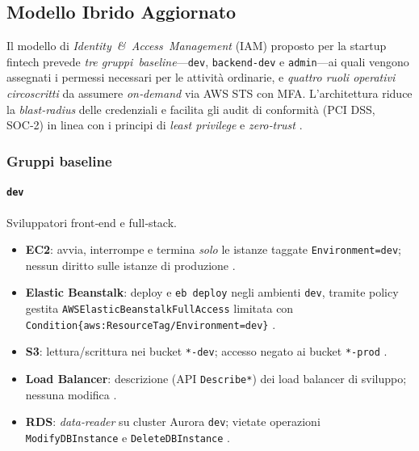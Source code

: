 \subsection{Modello Ibrido Aggiornato}
\label{subsec:modello_ibrido_aggiornato}

Il modello di \emph{Identity \& Access Management} (IAM) proposto per la startup fintech prevede \emph{tre gruppi baseline}—\texttt{dev}, \texttt{backend‑dev} e \texttt{admin}—ai quali vengono assegnati i permessi necessari per le attività ordinarie, e \emph{quattro ruoli operativi circoscritti} da assumere \emph{on‑demand} via AWS STS con MFA.
L'architettura riduce la \emph{blast‑radius} delle credenziali e facilita gli audit di conformità (PCI DSS, SOC‑2) in linea con i principi di \emph{least privilege} e \emph{zero‑trust} \cite{NIST_ZTA,NIST_SP80063,PCI_DSS,DatadogLeastPrivilege}.

\subsubsection{Gruppi baseline}
\label{subsubsec:gruppi_base}

\paragraph{\texttt{dev}}%
Sviluppatori front‑end e full‑stack.  
\begin{itemize}
  \item \textbf{EC2}: avvia, interrompe e termina \emph{solo} le istanze taggate \texttt{Environment=dev};
        nessun diritto sulle istanze di produzione \cite{AWSEC2IAM}.  
  \item \textbf{Elastic Beanstalk}: deploy e \verb|eb deploy| negli ambienti \texttt{dev},
        tramite policy gestita \texttt{AWSElasticBeanstalkFullAccess} limitata con
        \texttt{Condition\{aws:ResourceTag/Environment=dev\}} \cite{AWSEBRole}.  
  \item \textbf{S3}: lettura/scrittura nei bucket \texttt{*-dev}; accesso negato ai bucket \texttt{*-prod} \cite{AWSS3Security}.  
  \item \textbf{Load Balancer}: descrizione (API \texttt{Describe*}) dei load balancer di
        sviluppo; nessuna modifica \cite{AWSELBIAM}.  
  \item \textbf{RDS}: \emph{data‑reader} su cluster Aurora \texttt{dev}; vietate operazioni \texttt{ModifyDBInstance} e \texttt{DeleteDBInstance} \cite{AWSRDSIAM}.  
\end{itemize}

